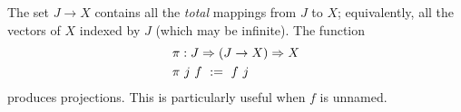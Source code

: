 The set $J \to X$ contains all the \emph{total} mappings from $J$ to $X$; equivalently, all the vectors of $X$ indexed by $J$ (which may be infinite).
The function
\begin{equation}
\begin{aligned}
	&\pi : J \Rightarrow (J \to X) \Rightarrow X \\
	&\pi~j~f \ := \ f~j
\end{aligned}
\end{equation}
produces projections. This is particularly useful when $f$ is unnamed.

